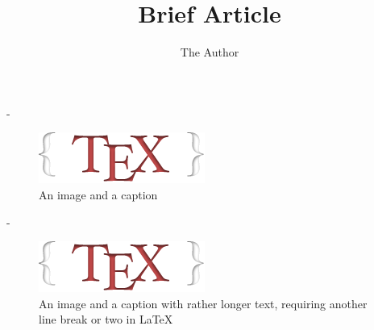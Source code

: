 \documentclass[twoside]{article}
\title{Brief Article}
\author{The Author}
\newif\ifduplex
\newlength{\overhang}
\newenvironment{fullwidth}{%
  \begin{adjustwidth\ifduplex*\fi}{}{-\overhang}}{%
  \end{adjustwidth\ifduplex*\fi}}
\begin{document}
\maketitle

\lipsum[1]

\begin{fullwidth}
  \begin{multicols}{2}
    \lipsum[2]
  \end{multicols}
  \begin{figure}[htbp]
    \centering
    \includegraphics{./logo.png}
    \caption{An image and a caption}
  \end{figure}
\end{fullwidth}

\lipsum[3-4]

\begin{fullwidth}
  \lipsum[5]
  \begin{figure}[htbp]
    \centering
    \includegraphics{./logo.png}
    \caption{An image and a caption with rather longer text, requiring another line break or two in \LaTeX}
  \end{figure}
  \begin{multicols}{2}
    \lipsum[6]
  \end{multicols}
\end{fullwidth}

\lipsum[7]
\end{document}

